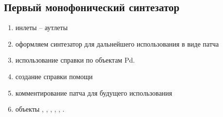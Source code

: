 \subsection{Первый монофонический синтезатор}
\begin{enumerate}
	\item инлеты -- аутлеты
	\item оформляем синтезатор для дальнейшего использования в виде патча \synth
	\item использование справки по объектам Pd.
	\item создание справки помощи \synthhelp
	\item комментирование патча для будущего использования
	\item объекты , , , , , .
\end{enumerate}

